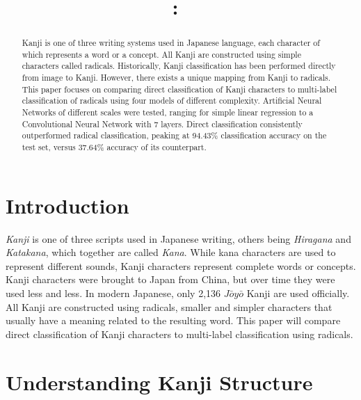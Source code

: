 \documentclass{article}
\title{
\vspace{2in}
\textmd{\textbf{\hmwkClass:\ \hmwkTitle}}\\
\vspace{0.1in}
\vspace{3in}
}
\author{\textbf{\hmwkAuthorName}}
\date{} %
\begin{document}
\begin{CJK*}{UTF8}{min}

\maketitle
\clearpage
\begin{abstract}
    Kanji is one of three writing systems used in Japanese language, each character of which represents a word or a concept. All Kanji are constructed using simple characters called radicals. Historically, Kanji classification has been performed directly from image to Kanji. However, there exists a unique mapping from Kanji to radicals. This paper focuses on comparing direct classification of Kanji characters to multi-label classification of radicals using four models of different complexity. Artificial Neural Networks of different scales were tested, ranging for simple linear regression to a Convolutional Neural Network with 7 layers. Direct classification consistently outperformed radical classification, peaking at 94.43\% classification accuracy on the test set, versus 37.64\% accuracy of its counterpart.
\end{abstract}

\section{Introduction}

\textit{Kanji} is one of three scripts used in Japanese writing, others being \textit{Hiragana} and \textit{Katakana}, which together are called \textit{Kana}. While kana characters are used to represent different sounds, Kanji characters represent complete words or concepts. Kanji characters were brought to Japan from China, but over time they were used less and less. In modern Japanese, only 2,136 $J\bar{o}y\bar{o}$ Kanji are used officially. All Kanji are constructed using radicals, smaller and simpler characters that usually have a meaning related to the resulting word. This paper will compare direct classification of Kanji characters to multi-label classification using radicals.

\section{Understanding Kanji Structure}


\end{CJK*}
\end{document}

